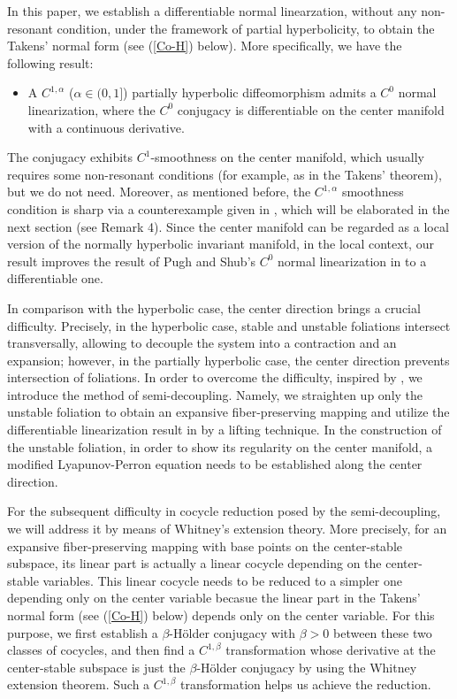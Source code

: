 \documentclass[reqno]{amsart}
\numberwithin{equation}{section}
\begin{document}
In this paper, we  establish a differentiable normal linearzation, without any non-resonant condition, under the framework of partial hyperbolicity, to obtain the Takens' normal form (see (\ref{Co-H}) below).
More specifically, we have the following result:
\begin{itemize}
\item A 
$C^{1,\alpha}$ ($\alpha\in (0,1]$)
partially hyperbolic diffeomorphism admits a $C^0$ normal linearization, where the $C^0$ conjugacy is differentiable on the center manifold with a continuous derivative.
\end{itemize}
The conjugacy exhibits $C^1$-smoothness on the center manifold, which usually requires some non-resonant conditions (for example, as in the Takens' theorem), but we do not need.
Moreover, as mentioned before, the $C^{1,\alpha}$ smoothness condition is sharp via a counterexample given in \cite{ZLZ-TAMS}, which will be elaborated in the next section (see Remark 4).
Since the center manifold can be regarded as a local version of the normally hyperbolic invariant manifold, in the local context, our result improves the result of Pugh and Shub's $C^0$ normal linearization in \cite{PS-InventMath} to a differentiable one.


In comparison with the hyperbolic case, the center direction brings a crucial difficulty. Precisely, in the hyperbolic case, stable and unstable foliations intersect transversally, allowing to decouple the system into a contraction and an expansion; however, in the partially hyperbolic case,  the center direction prevents intersection of foliations. In order to overcome the difficulty, inspired by \cite{PS-InventMath}, we introduce the method of semi-decoupling. Namely, we straighten up only the unstable foliation to obtain an expansive fiber-preserving mapping and utilize the differentiable linearization result in \cite{ZLZ-TAMS} by a lifting technique. In the construction of the unstable foliation, in order to show its regularity on the center manifold, a modified Lyapunov-Perron equation needs to be established along the center direction.

For the subsequent difficulty in cocycle reduction posed by the semi-decoupling, we will address it by means of Whitney's extension theory.
More precisely, for an expansive fiber-preserving mapping with base points on the center-stable subspace, its linear part is actually a linear cocycle depending on the center-stable variables. This linear cocycle needs to be reduced to a simpler one depending only on the center variable becasue the linear part in the Takens' normal form (see (\ref{Co-H}) below) depends only on the center variable. For this purpose, we first establish a $\beta$-H\"{o}lder conjugacy with $\beta>0$ between these two classes of cocycles, and then find a $C^{1,\beta}$ transformation whose derivative at the center-stable subspace is just the
$\beta$-H\"{o}lder conjugacy by using the Whitney extension theorem. Such a $C^{1,\beta}$ transformation helps us achieve the reduction.
\end{document}
